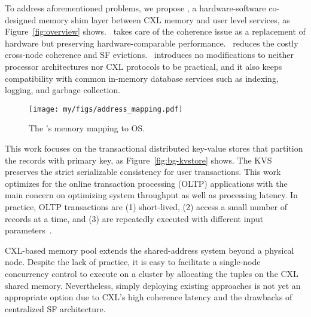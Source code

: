 

\ifx\stale\undefined

To address aforementioned problems, we propose \name, a hardware-software co-designed memory shim layer between CXL memory and user level services, as Figure~\ref{fig:overview} shows.
\name~takes care of the coherence issue as a replacement of hardware but preserving hardware-comparable performance. 
\name~reduces the costly cross-node coherence and SF evictions. 
\name~introduces no modifications to neither processor architectures nor CXL protocols to be practical, and it also keeps compatibility with common in-memory database services such as indexing, logging, and garbage collection. 

\fi




\begin{figure}[t]
  \centering
   \texttt{[image: my/figs/address\_mapping.pdf]}
  \caption{The \name's memory mapping to OS. }
  \label{fig:runtime} 
\end{figure}



\ifx\stale\undefined
This work focuses on the transactional distributed key-value stores that partition the records with primary key, as Figure~\ref{fig:bg-kvstore} shows.
The KVS preserves the strict serializable consistency for user transactions. 
This work optimizes for the online transaction processing (OLTP) applications with the main concern on optimizing system throughput as well as processing latency. In practice, OLTP transactions are (1) short-lived, (2) access a small number of records at a time, and (3) are repeatedly executed with different input parameters~\cite{dbx1000_dist_vldb17}. 

CXL-based memory pool extends the shared-address system beyond a physical node. 
Despite the lack of practice, it is easy to facilitate a single-node concurrency control to execute on a cluster by allocating the tuples on the CXL shared memory. 
Nevertheless, simply deploying existing approaches is not yet an appropriate option due to CXL's high coherence latency and the drawbacks of centralized SF architecture. 


